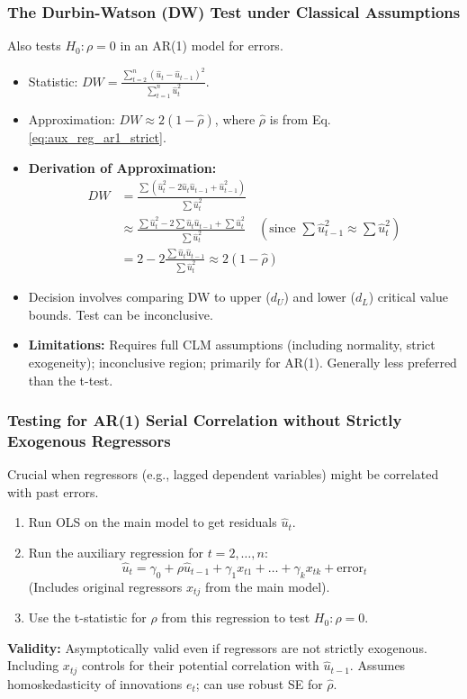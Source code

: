 \documentclass[a4paper, 10pt]{article}
\theoremstyle{definition}	%
\begin{document}
\subsubsection{The Durbin-Watson (DW) Test under Classical Assumptions}
Also tests \(H_0: \rho=0\) in an AR(1) model for errors.
\begin{itemize}
    \item Statistic: \( DW = \frac{\sum_{t=2}^n (\hat{u}_t - \hat{u}_{t-1})^2}{\sum_{t=1}^n \hat{u}_t^2} \).
    \item Approximation: \( DW \approx 2(1 - \hat{\rho}) \), where \(\hat{\rho}\) is from Eq. \eqref{eq:aux_reg_ar1_strict}.
    \item \textbf{Derivation of Approximation:}
    \begin{align*}
    DW &= \frac{\sum (\hat{u}_t^2 - 2\hat{u}_t \hat{u}_{t-1} + \hat{u}_{t-1}^2)}{\sum \hat{u}_t^2} \\
    &\approx \frac{\sum \hat{u}_t^2 - 2\sum \hat{u}_t \hat{u}_{t-1} + \sum \hat{u}_t^2}{\sum \hat{u}_t^2} \quad (\text{since } \sum \hat{u}_{t-1}^2 \approx \sum \hat{u}_t^2) \\
    &= 2 - 2 \frac{\sum \hat{u}_t \hat{u}_{t-1}}{\sum \hat{u}_t^2} \approx 2(1 - \hat{\rho})
    \end{align*}
    \item Decision involves comparing DW to upper (\(d_U\)) and lower (\(d_L\)) critical value bounds. Test can be inconclusive.
    \item \textbf{Limitations:} Requires full CLM assumptions (including normality, strict exogeneity); inconclusive region; primarily for AR(1). Generally less preferred than the t-test.
\end{itemize}

\subsubsection{Testing for AR(1) Serial Correlation without Strictly Exogenous Regressors}
Crucial when regressors (e.g., lagged dependent variables) might be correlated with past errors.
\begin{enumerate}
    \item Run OLS on the main model to get residuals \(\hat{u}_t\).
    \item Run the auxiliary regression for \(t=2, \dots, n\):
    \begin{equation} \label{eq:aux_reg_ar1_general}
    \hat{u}_t = \gamma_0 + \rho \hat{u}_{t-1} + \gamma_1 x_{t1} + \dots + \gamma_k x_{tk} + \text{error}_t
    \end{equation}
    (Includes original regressors \(x_{tj}\) from the main model).
    \item Use the t-statistic for \(\hat{\rho}\) from this regression to test \(H_0: \rho=0\).
\end{enumerate}
\textbf{Validity:} Asymptotically valid even if regressors are not strictly exogenous. Including \(x_{tj}\) controls for their potential correlation with \(\hat{u}_{t-1}\). Assumes homoskedasticity of innovations \(e_t\); can use robust SE for \(\hat{\rho}\).
\end{document}
